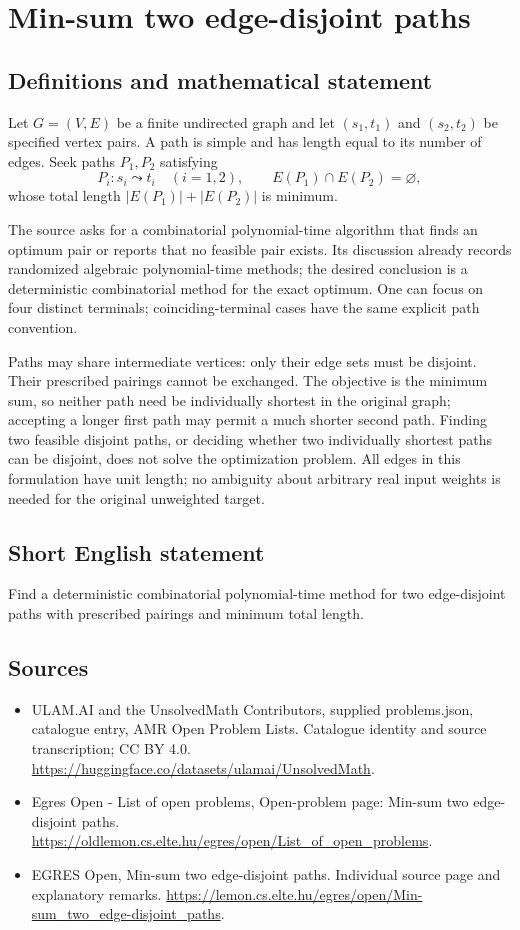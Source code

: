 \documentclass[11pt,a4paper]{article}
\begin{document}
\section*{Min-sum two edge-disjoint paths}\label{statement}

\subsection{Definitions and mathematical statement}
Let $G=(V,E)$ be a finite undirected graph and let $(s_1,t_1)$ and
$(s_2,t_2)$ be specified vertex pairs. A path is simple and has length
equal to its number of edges. Seek paths $P_1,P_2$ satisfying
\[
 P_i:s_i\leadsto t_i\quad(i=1,2),\qquad
 E(P_1)\cap E(P_2)=\varnothing,
\]
whose total length $|E(P_1)|+|E(P_2)|$ is minimum.

The source asks for a combinatorial polynomial-time algorithm that
finds an optimum pair or reports that no feasible pair exists.
Its discussion already records randomized algebraic polynomial-time
methods; the desired conclusion is a deterministic combinatorial
method for the exact optimum. One can focus on four distinct terminals;
coinciding-terminal cases have the same explicit path convention.

Paths may share intermediate vertices: only their edge sets must be
disjoint. Their prescribed pairings cannot be exchanged. The objective
is the minimum sum, so neither path need be individually shortest
in the original graph; accepting a longer first path may permit a
much shorter second path. Finding two feasible disjoint paths, or
deciding whether two individually shortest paths can be disjoint,
does not solve the optimization problem. All edges in this formulation
have unit length; no ambiguity about arbitrary real input weights
is needed for the original unweighted target.
\subsection{Short English statement}
Find a deterministic combinatorial polynomial-time method for
two edge-disjoint paths with prescribed pairings and minimum total length.
\subsection{Sources}
\begin{itemize}
\item[S1] ULAM.AI and the UnsolvedMath Contributors, supplied problems.json, catalogue entry, AMR Open Problem Lists. Catalogue identity and source transcription; CC BY 4.0.
\url{https://huggingface.co/datasets/ulamai/UnsolvedMath}.
\item[S2] Egres Open - List of open problems, Open-problem page: Min-sum two edge-disjoint paths. 
\url{https://oldlemon.cs.elte.hu/egres/open/List_of_open_problems}.
\item[S3] EGRES Open, Min-sum two edge-disjoint paths. Individual source page and explanatory remarks.
\url{https://lemon.cs.elte.hu/egres/open/Min-sum_two_edge-disjoint_paths}.
\end{itemize}
\end{document}
